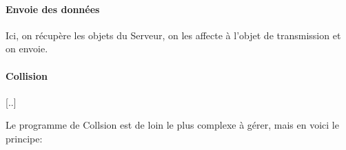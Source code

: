 \documentclass[a4paper,12pt]{report}
\begin{document}
\paragraph{Envoie des données}



Ici, on récupère les objets du Serveur, on les affecte à l'objet de transmission et on envoie.







\paragraph{Collision}



[..]



Le programme de Collsion est de loin le plus complexe à gérer, mais en voici le principe:
\end{document}
